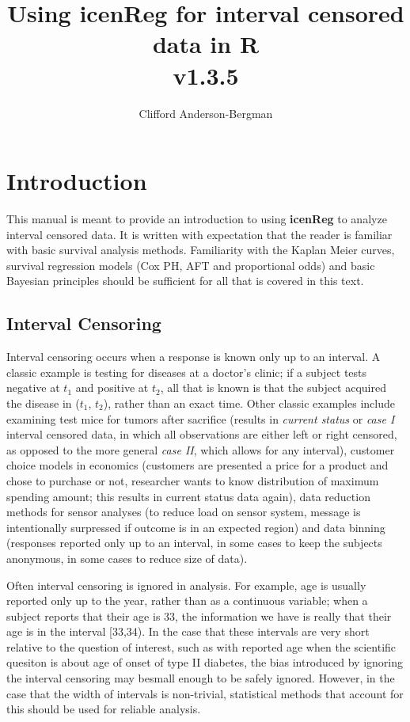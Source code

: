 \documentclass[a4paper]{article}
\begin{document}


\title{Using {\bf{icenReg}} for interval censored data in {\bf{R} } \\ v1.3.5}
\author{Clifford Anderson-Bergman}
\maketitle


\tableofcontents

\section{Introduction}



This manual is meant to provide an introduction to using {\bf icenReg} to analyze interval censored data. It is written with expectation that the reader is familiar with basic survival analysis methods. Familiarity with the Kaplan Meier curves, survival regression models (Cox PH, AFT and proportional odds) and basic Bayesian principles should be sufficient for all that is covered in this text.

\subsection{Interval Censoring}

Interval censoring occurs when a response is known only up to an interval. A classic example is testing for diseases at a doctor's clinic; if a subject tests negative at $t_1$ and positive at $t_2$, all that is known is that the subject acquired the disease in ($t_1$, $t_2$), rather than an exact time. Other classic examples include examining test mice for tumors after sacrifice (results in \emph{current status} or \emph{case I} interval censored data, in which all observations are either left or right censored, as opposed to the more general \emph{case II}, which allows for any interval), customer choice models in economics (customers are presented a price for a product and chose to purchase or not, researcher wants to know distribution of maximum spending amount; this results in current status data again), data reduction methods for sensor analyses (to reduce load on sensor system, message is intentionally surpressed if outcome is in an expected region) and data binning (responses reported only up to an interval, in some cases to keep the subjects anonymous, in some cases to reduce size of data). 

  
Often interval censoring is ignored in analysis. For example, age is usually reported only up to the year, rather than as a continuous variable; when a subject reports that their age is 33, the information we have is really that their age is in the interval [33,34). In the case that these intervals are very short relative to the question of interest, such as with reported age when the scientific quesiton is about age of onset of type II diabetes, the bias introduced by ignoring the interval censoring may besmall enough to be safely ignored. However, in the case that the width of intervals is non-trivial, statistical methods that account for this should be used for reliable analysis. 
  
\end{document}
